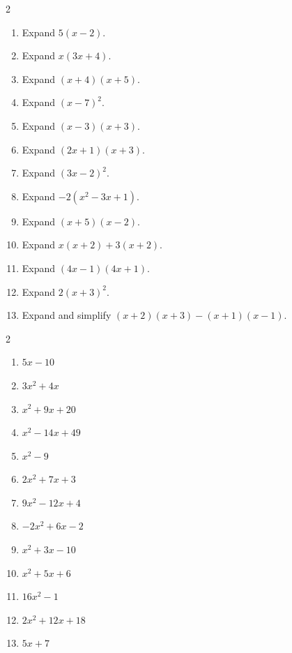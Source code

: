\documentclass[11pt]{article}
\begin{document}
\begin{recapbox}
\begin{multicols}{2}
\small
\begin{enumerate}[leftmargin=*,itemsep=3pt]
  \item Expand $5(x-2)$.
  \item Expand $x(3x+4)$.
  \item Expand $(x+4)(x+5)$.
  \item Expand $(x-7)^2$.
  \item Expand $(x-3)(x+3)$.
  \item Expand $(2x+1)(x+3)$.
  \item Expand $(3x-2)^2$.
  \item Expand $-2(x^2-3x+1)$.
  \item Expand $(x+5)(x-2)$.
  \item Expand $x(x+2)+3(x+2)$.
  \item Expand $(4x-1)(4x+1)$.
  \item Expand $2(x+3)^2$.
  \item Expand and simplify $(x+2)(x+3)-(x+1)(x-1)$.
\end{enumerate}
\end{multicols}
\end{recapbox}

\begin{keybox}
\begin{multicols}{2}
\small
\begin{enumerate}[leftmargin=*,itemsep=3pt]
  \item $5x-10$
  \item $3x^2+4x$
  \item $x^2+9x+20$
  \item $x^2-14x+49$
  \item $x^2-9$
  \item $2x^2+7x+3$
  \item $9x^2-12x+4$
  \item $-2x^2+6x-2$
  \item $x^2+3x-10$
  \item $x^2+5x+6$
  \item $16x^2-1$
  \item $2x^2+12x+18$
  \item $5x+7$
\end{enumerate}
\end{multicols}
\end{keybox}
\end{document}
